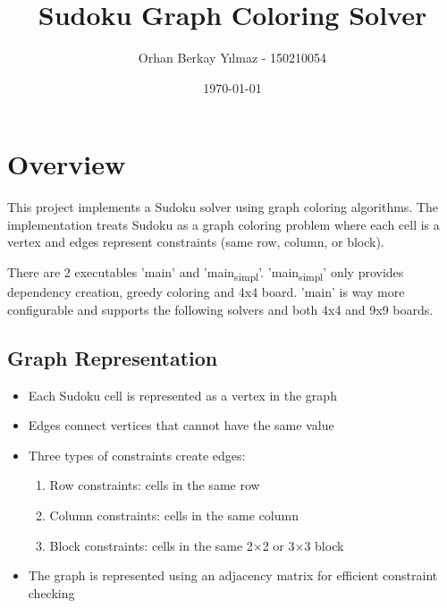 \documentclass[11pt]{article}
\author{Orhan Berkay Yılmaz - 150210054}
\date{\today}
\title{Sudoku Graph Coloring Solver}
\begin{document}
\maketitle
\section{Overview}
\label{sec:orgfcd7e9e}
This project implements a Sudoku solver using graph coloring algorithms. The implementation treats Sudoku as a graph coloring problem where each cell is a vertex and edges represent constraints (same row, column, or block).

There are 2 executables 'main' and 'main\textsubscript{simpl}'. 'main\textsubscript{simpl}' only provides dependency creation, greedy coloring and 4x4 board. 'main' is way more configurable and supports the following solvers and both 4x4 and 9x9 boards.
\subsection{Graph Representation}
\label{sec:org61ba6c8}
\begin{itemize}
\item Each Sudoku cell is represented as a vertex in the graph
\item Edges connect vertices that cannot have the same value
\item Three types of constraints create edges:
\begin{enumerate}
\item Row constraints: cells in the same row
\item Column constraints: cells in the same column
\item Block constraints: cells in the same 2×2 or 3×3 block
\end{enumerate}
\item The graph is represented using an adjacency matrix for efficient constraint checking
\end{itemize}
\end{document}

